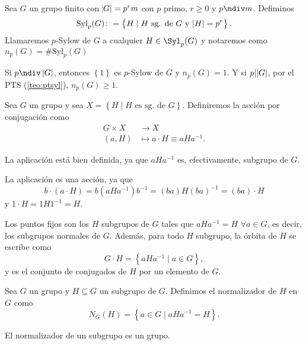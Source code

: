 \begin{defi}
    Sea $G$ un grupo finito con $\abs{G} = p^rm$ con $p$ primo, $r \geq 0$ y $p \ndiv m$. Defiminos
    \[
        \text{Syl}_p(G) \colon = \left\{H \mid H \text{ sg. de } G \text{ y } \abs{H} = p^r \right\}.
    \]
    Llamaremos $p$-Sylow de $G$ a cualquier $H \in \Syl_p(G)$ y notaremos como $n_p(G) = \# \text{Syl}_p(G)$
\end{defi}

\begin{obs}
    Si $p \ndiv\, \abs{G}$, entonces $\left\{ 1 \right\}$ es $p$-Sylow de $G$ y $n_p(G) = 1$. Y si
    $p \vert \abs{G}$, por el PTS (\ref{teo:ptsyl}), $n_p(G) \geq 1$.
\end{obs}

\begin{defi}
    Sea $G$ un grupo y sea $X = \left\{ H \mid H \text{ es sg. de } G\right\}$. Definiremos la acción por
    conjugación como
    \[
        \begin{aligned}
            G \times X &\to X \\
            (a, H) &\mapsto a\cdot H \equiv aHa^{-1}.
        \end{aligned}
    \]
\end{defi}

\begin{obs}
    La aplicación está bien definida, ya que $aHa^{-1}$ es, efectivamente, subgrupo de $G$.
\end{obs}

\begin{obs}
    La aplicación es una acción, ya que
    \[
        b \cdot (a \cdot H) = b\left( aHa^{-1} \right)b^{-1} = (ba)H(ba)^{-1} = (ba) \cdot H
    \]
    y $1 \cdot H = 1 H 1^{-1} = H$.
\end{obs}

\begin{obs}
    Los puntos fijos son los $H$ subgrupos de $G$ tales que $aHa^{-1} = H$ $\forall a \in G$, es decir,
    los subgrupos normales de $G$. Además, para todo $H$ subgrupo, la órbita de $H$
    se escribe como
    \[
        G\cdot H = \left\{ aHa^{-1} \mid a \in G \right\},
    \]
    y es el conjunto de conjugados de $H$ por un elemento de $G$.
\end{obs}

\begin{defi}
    Sea $G$ un grupo y $H \subseteq G$ un subgrupo de $G$. Definimos el normalizador de $H$ en $G$ como
    \[
        N_G(H) = \left\{ a \in G \mid aHa^{-1} = H \right\}.
    \]
\end{defi}
\begin{obs}
    El normalizador de un subgrupo es un grupo.
\end{obs}

